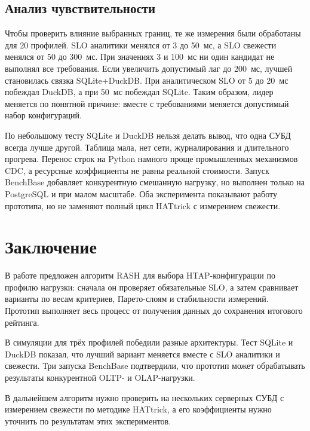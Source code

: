 \documentclass{misisarticle}
\begin{document}
\subsection{\textnormal{Анализ чувствительности}}

	Чтобы проверить влияние выбранных границ, те же измерения были обработаны для 20 профилей. SLO аналитики менялся от 3 до 50~мс, а SLO свежести менялся от 50 до 300~мс. При значениях 3 и 100~мс ни один кандидат не выполнял все требования. Если увеличить допустимый лаг до 200~мс, лучшей становилась связка SQLite+DuckDB. При аналитическом SLO от 5 до 20~мс побеждал DuckDB, а при 50~мс побеждал SQLite. Таким образом, лидер меняется по понятной причине: вместе с требованиями меняется допустимый набор конфигураций.

	По небольшому тесту SQLite и DuckDB нельзя делать вывод, что одна СУБД всегда лучше другой. Таблица мала, нет сети, журналирования и длительного прогрева. Перенос строк на Python намного проще промышленных механизмов CDC, а ресурсные коэффициенты не равны реальной стоимости. Запуск BenchBase добавляет конкурентную смешанную нагрузку, но выполнен только на PostgreSQL и при малом масштабе. Оба эксперимента показывают работу прототипа, но не заменяют полный цикл HATtrick с измерением свежести.

\section{Заключение}

	В работе предложен алгоритм RASH для выбора HTAP-конфигурации по профилю нагрузки: сначала он проверяет обязательные SLO, а затем сравнивает варианты по весам критериев, Парето-слоям и стабильности измерений. Прототип выполняет весь процесс от получения данных до сохранения итогового рейтинга. 
	
	В симуляции для трёх профилей победили разные архитектуры. Тест SQLite и DuckDB показал, что лучший вариант меняется вместе с SLO аналитики и свежести. Три запуска BenchBase подтвердили, что прототип может обрабатывать результаты конкурентной OLTP- и OLAP-нагрузки. 
	
	В дальнейшем алгоритм нужно проверить на нескольких серверных СУБД с измерением свежести по методике HATtrick, а его коэффициенты нужно уточнить по результатам этих экспериментов.
\end{document}
